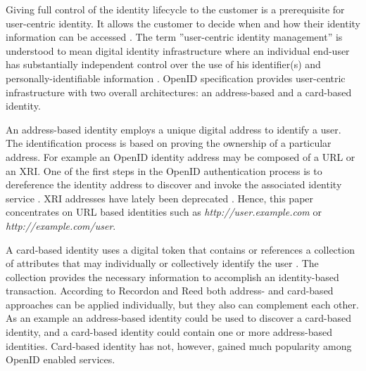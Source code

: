 \documentclass[english,gradu]{tktltiki}
\begin{document}
Giving full control of the identity lifecycle to the customer is a prerequisite for user-centric identity. It allows the customer to decide when and how their identity information can be accessed \cite{open_identity_management_saas_2009}. The term ''user-centric identity management'' is understood to mean digital identity infrastructure where an individual end-user has substantially independent control over the use of his identifier(s) and personally-identifiable information \cite{openid_2.0_platform_2009}. OpenID specification provides user-centric infrastructure with two overall architectures: an address-based and a card-based identity.

An address-based identity employs a unique digital address to identify a user. The identification process is based on proving the ownership of a particular address. For example an OpenID identity address may be composed of a URL or an XRI. One of the first steps in the OpenID authentication process is to dereference the identity address to discover and invoke the associated identity service \cite{openid_2.0_platform_2009}. XRI addresses have lately been deprecated \cite{xri_depcrecated_08a, xri_depcrecated_08b, xri_depcrecated_08c, xri_depcrecated_08d}. Hence, this paper concentrates on URL based identities such as \emph{http://user.example.com} or \emph{http://example.com/user}.

A card-based identity uses a digital token that contains or references a collection of attributes that may individually or collectively identify the user \cite{openid_2.0_platform_2009}. The collection provides the necessary information to accomplish an identity-based transaction. According to Recordon and Reed \cite{openid_2.0_platform_2009} both address- and card-based approaches can be applied individually, but they also can complement each other. As an example an address-based identity could be used to discover a card-based identity, and a card-based identity could contain one or more address-based identities. Card-based identity has not, however, gained much popularity among OpenID enabled services.


\end{document}
